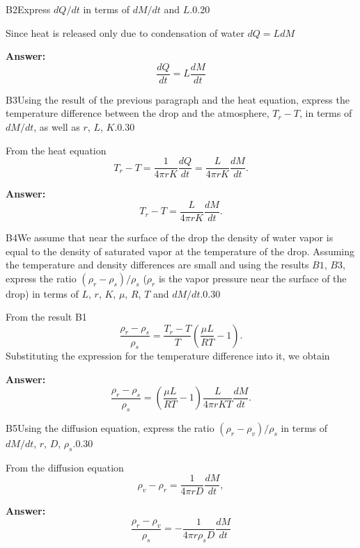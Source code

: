 \documentclass[11pt,a4paper]{article}
\begin{document}
\begin{solcard}{B2}{Express $dQ/dt$ in terms of $dM/dt$ and $L$.}{0.20}

Since heat is released only due to condensation of water $dQ = L dM$

\par\smallskip\noindent\textbf{Answer:} $$ \frac{dQ}{dt} = L \frac{dM}{dt} $$
\end{solcard}

\begin{solcard}{B3}{Using the result of the previous paragraph and the heat equation, express the temperature difference between the drop and the atmosphere, $T_r- T$, in terms of $dM/dt$, as well as $r$, $L$, $K$.}{0.30}

From the heat equation $$ T_r -  T = \frac{1}{4 \pi r K} \frac{dQ}{dt} = \frac{L}{4 \pi r K} \frac{dM}{dt}. $$

\par\smallskip\noindent\textbf{Answer:} $$ T_r -  T = \frac{L}{4 \pi r K} \frac{dM}{dt}. $$
\end{solcard}

\begin{solcard}{B4}{We assume that near the surface of the drop the density of water vapor is equal to the density of saturated vapor at the temperature of the drop. Assuming the temperature and density differences are small and using the results $B1$, $B3$, express the ratio $(\rho_r - \rho_s)/\rho_s$ ($\rho_r$ is the vapor pressure near the surface of the drop) in terms of $L$, $r$, $K$, $\mu$, $R$, $T$ and $dM/dt$.}{0.30}

From the result B1 $$ \frac{\rho_r - \rho_s}{\rho_s} = \frac{T_r - T}{T}  \left( \frac{\mu L}{R T} - 1\right). $$ Substituting the expression for the temperature difference into it, we obtain

\par\smallskip\noindent\textbf{Answer:} $$ \frac{\rho_r - \rho_s}{\rho_s} =  \left( \frac{\mu L}{R T} - 1\right)\frac{L}{4 \pi r K T} \frac{dM}{dt}. $$
\end{solcard}

\begin{solcard}{B5}{Using the diffusion equation, express the ratio $(\rho_r - \rho_v)/\rho_s$ in terms of $dM/dt$, $r$, $D$, $\rho_s$.}{0.30}

From the diffusion equation $$ \rho_v - \rho_r = \frac{1}{4 \pi r D} \frac{dM}{dt}, $$

\par\smallskip\noindent\textbf{Answer:} $$ \frac{\rho_r - \rho_v}{\rho_s} = - \frac{1}{4 \pi r \rho_s D} \frac{dM}{dt} $$
\end{solcard}
\end{document}
